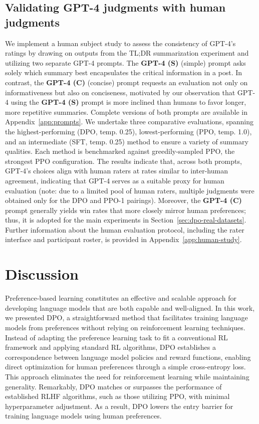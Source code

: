 \subsection{Validating GPT-4 judgments with human judgments}
\label{sec:human-judgments}
We implement a human subject study to assess the consistency of GPT-4's ratings by drawing on outputs from the TL;DR summarization experiment and utilizing two separate GPT-4 prompts. The \textbf{GPT-4 (S)} (simple) prompt asks solely which summary best encapsulates the critical information in a post. In contrast, the \textbf{GPT-4 (C)} (concise) prompt requests an evaluation not only on informativeness but also on conciseness, motivated by our observation that GPT-4 using the \textbf{GPT-4 (S)} prompt is more inclined than humans to favor longer, more repetitive summaries. Complete versions of both prompts are available in Appendix~\ref{app:prompts}. We undertake three comparative evaluations, spanning the highest-performing (DPO, temp. 0.25), lowest-performing (PPO, temp. 1.0), and an intermediate (SFT, temp. 0.25) method to ensure a variety of summary qualities. Each method is benchmarked against greedily-sampled PPO, the strongest PPO configuration. The results indicate that, across both prompts, GPT-4's choices align with human raters at rates similar to inter-human agreement, indicating that GPT-4 serves as a suitable proxy for human evaluation (note: due to a limited pool of human raters, multiple judgments were obtained only for the DPO and PPO-1 pairings). Moreover, the \textbf{GPT-4 (C)} prompt generally yields win rates that more closely mirror human preferences; thus, it is adopted for the main experiments in Section~\ref{sec:dpo-real-datasets}. Further information about the human evaluation protocol, including the rater interface and participant roster, is provided in Appendix~\ref{app:human-study}.

\section{Discussion}
Preference-based learning constitutes an effective and scalable approach for developing language models that are both capable and well-aligned. In this work, we presented DPO, a straightforward method that facilitates training language models from preferences without relying on reinforcement learning techniques. Instead of adapting the preference learning task to fit a conventional RL framework and applying standard RL algorithms, DPO establishes a correspondence between language model policies and reward functions, enabling direct optimization for human preferences through a simple cross-entropy loss. This approach eliminates the need for reinforcement learning while maintaining generality. Remarkably, DPO matches or surpasses the performance of established RLHF algorithms, such as those utilizing PPO, with minimal hyperparameter adjustment. As a result, DPO lowers the entry barrier for training language models using human preferences.

